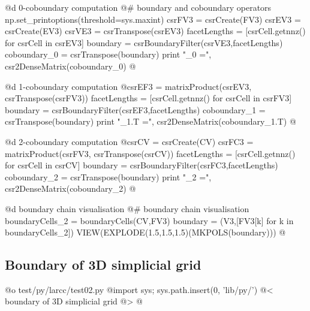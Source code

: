 \documentclass[11pt,oneside]{article}	%
\begin{document}
@d 0-coboundary computation
@{# boundary and coboundary operators
np.set_printoptions(threshold=sys.maxint)
csrFV3 = csrCreate(FV3)
csrEV3 = csrCreate(EV3)
csrVE3 = csrTranspose(csrEV3)
facetLengths = [csrCell.getnnz() for csrCell in csrEV3]
boundary = csrBoundaryFilter(csrVE3,facetLengths)
coboundary_0 = csrTranspose(boundary)
print "\ncoboundary_0 =\n", csr2DenseMatrix(coboundary_0)
@}

@d 1-coboundary computation
@{csrEF3 = matrixProduct(csrEV3, csrTranspose(csrFV3))
facetLengths = [csrCell.getnnz() for csrCell in csrFV3]
boundary = csrBoundaryFilter(csrEF3,facetLengths)
coboundary_1 = csrTranspose(boundary)
print "\ncoboundary_1.T =\n", csr2DenseMatrix(coboundary_1.T)
@}

@d 2-coboundary computation
@{csrCV = csrCreate(CV)
csrFC3 = matrixProduct(csrFV3, csrTranspose(csrCV))
facetLengths = [csrCell.getnnz() for csrCell in csrCV]
boundary = csrBoundaryFilter(csrFC3,facetLengths)
coboundary_2 = csrTranspose(boundary)
print "\ncoboundary_2 =\n", csr2DenseMatrix(coboundary_2)
@}

@d boundary chain visualisation
@{# boundary chain visualisation
boundaryCells_2 = boundaryCells(CV,FV3)
boundary = (V3,[FV3[k] for k in boundaryCells_2])
VIEW(EXPLODE(1.5,1.5,1.5)(MKPOLS(boundary)))
@}



\subsection{Boundary of 3D simplicial grid}

@o test/py/larcc/test02.py
@{import sys; sys.path.insert(0, 'lib/py/')
@< boundary of 3D simplicial grid @>
@}
\end{document}
